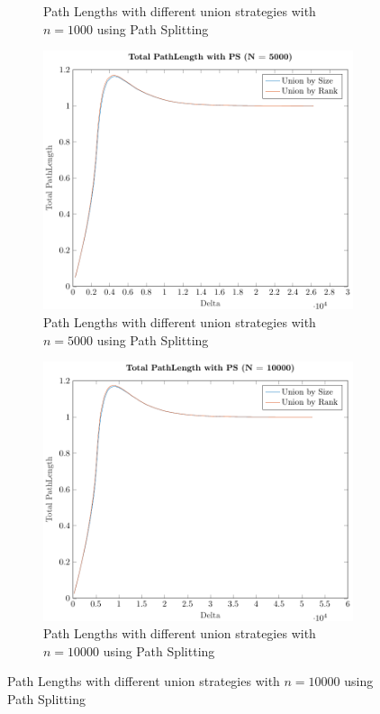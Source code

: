 \begin{figure}[ht]
\begin{subfigure}{0.32\textwidth}
        \caption{Path Lengths with different union strategies with $n = 1000$ using Path Splitting}
    \end{subfigure}%
    \hfill
    \begin{subfigure}{0.32\textwidth}
        \centering
        \includegraphics[width=\textwidth]{../images/plotPSNonFull5000_PathLength.pdf}
        \caption{Path Lengths with different union strategies with $n = 5000$ using Path Splitting}
    \end{subfigure}%
    \hfill
    \begin{subfigure}{0.32\textwidth}
        \centering
        \includegraphics[width=\textwidth]{../images/plotPSNonFull10000_PathLength.pdf}
        \caption{Path Lengths with different union strategies with $n = 10000$ using Path Splitting}
    \end{subfigure}


\end{figure}
